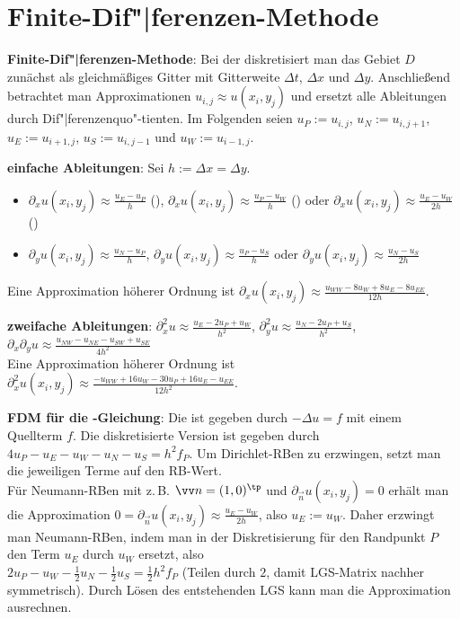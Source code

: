 \pagebreak

\section{%
    Finite-Dif"|ferenzen-Methode%
}

\textbf{Finite-Dif"|ferenzen-Methode}:
Bei der  diskretisiert man das Gebiet $D$ zunächst
als gleichmäßiges Gitter mit Gitterweite $\Delta t$, $\Delta x$ und $\Delta y$.
Anschließend betrachtet man Approximationen $u_{i,j} \approx u(x_i, y_j)$
und ersetzt alle Ableitungen durch Dif"|ferenzenquo"-tienten.
Im Folgenden seien
$u_P := u_{i,j}$,
$u_N := u_{i,j+1}$,
$u_E := u_{i+1,j}$,
$u_S := u_{i,j-1}$ und
$u_W := u_{i-1,j}$.

\textbf{einfache Ableitungen}:
Sei $h := \Delta x = \Delta y$.
\begin{itemize}
    \item
    $\partial_x u(x_i, y_j) \approx \frac{u_E - u_P}{h}$ (),
    $\partial_x u(x_i, y_j) \approx \frac{u_P - u_W}{h}$ () oder
    $\partial_x u(x_i, y_j) \approx \frac{u_E - u_W}{2h}$ ()

    \item
    $\partial_y u(x_i, y_j) \approx \frac{u_N - u_P}{h}$,
    $\partial_y u(x_i, y_j) \approx \frac{u_P - u_S}{h}$ oder
    $\partial_y u(x_i, y_j) \approx \frac{u_N - u_S}{2h}$
\end{itemize}
Eine Approximation höherer Ordnung ist
$\partial_x u(x_i, y_j) \approx \frac{u_{WW} - 8u_W + 8u_E - 8u_{EE}}{12h}$.

\textbf{zweifache Ableitungen}:
$\partial_x^2 u \approx \frac{u_E - 2u_P + u_W}{h^2}$,
$\partial_y^2 u \approx \frac{u_N - 2u_P + u_S}{h^2}$,
$\partial_x \partial_y u \approx \frac{u_{NW} - u_{NE} - u_{SW} + u_{SE}}{4h^2}$\\
Eine Approximation höherer Ordnung ist
$\partial_x^2 u(x_i, y_j) \approx \frac{-u_{WW} + 16u_W - 30u_P + 16u_E - u_{EE}}{12h^2}$.

\linie

\textbf{FDM für die -Gleichung}:
Die  ist gegeben durch $-\Delta u = f$ mit einem Quellterm $f$.
Die diskretisierte Version ist gegeben durch
$4u_P - u_E - u_W - u_N - u_S = h^2 f_P$.
Um Dirichlet-RBen zu erzwingen, setzt man die jeweiligen Terme auf den RB-Wert.\\
Für Neumann-RBen mit z.\,B. $\vec{n} = (1, 0)^\tp$ und $\partial_{\vec{n}} u(x_i, y_j) = 0$
erhält man die Approximation $0 = \partial_{\vec{n}} u(x_i, y_j) \approx \frac{u_E - u_W}{2h}$,
also $u_E := u_W$.
Daher erzwingt man Neumann-RBen, indem man in der Diskretisierung für den Randpunkt $P$
den Term $u_E$ durch $u_W$ ersetzt, also\\
$2u_P - u_W - \frac{1}{2} u_N - \frac{1}{2} u_S = \frac{1}{2} h^2 f_P$
(Teilen durch $2$, damit LGS-Matrix nachher symmetrisch).
Durch Lösen des entstehenden LGS kann man die Approximation ausrechnen.

